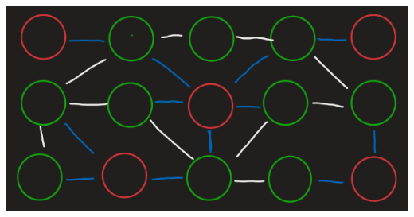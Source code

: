\documentclass[11pt]{article}
\begin{document}
{\begin{enumerate} 
\begin{center}
		\includegraphics[scale=1]{canvas_1_1}\\                                                                                                                                                                                                                                                                                                                                                                                                                                                                                                                                                                                                                                                                                                                                                                                                                                                                                                                                                                                                                                                                                                                                                                                                                                                                                                                                                                                                                                                                                                                                                                                                                                                                                                                                                                                                                                                                                                                                                                                                                                                                                                                                                                                                                                                                                                                                                                                                                                                                                                                                                                                                 
\end{center}
\end{enumerate}}
\end{document}
